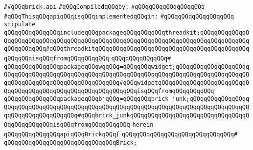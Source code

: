 \label{src/lib/x-kit/tut/badbricks-game/brick.api}
\verb|##qQQqbrick.api|\newline
\newline
\verb|#qQQqCompiledqQQqby:|\newline
\verb|#qQQqqQQqqQQqqQQqqQQq|\newline
\newline
\verb|#qQQqThisqQQqapiqQQqisqQQqimplementedqQQqin:|\newline
\verb|#qQQqqQQqqQQqqQQqqQQq|\newline
\newline
\verb|stipulate|\newline
\verb|qQQqqQQqqQQqqQQqincludeqQQqpackageqQQqqQQqqQQqthreadkit;qQQqqQQqqQQqqQQqqQQqqQQqqQQqqQQqqQQqqQQqqQQqqQQqqQQqqQQqqQQqqQQqqQQqqQQqqQQqqQQqqQQqqQQqqQQqqQQq#qQQqthreadkitqQQqqQQqqQQqqQQqqQQqqQQqqQQqqQQqqQQqqQQqqQQqqQQqqQQqisqQQqfromqQQqqQQqqQQq|\newline
\verb|qQQqqQQqqQQqqQQq#|\newline
\verb|qQQqqQQqqQQqqQQqpackageqQQqwgqQQq=qQQqqQQqwidget;qQQqqQQqqQQqqQQqqQQqqQQqqQQqqQQqqQQqqQQqqQQqqQQqqQQqqQQqqQQqqQQqqQQqqQQqqQQqqQQqqQQqqQQqqQQqqQQqqQQqqQQqqQQqqQQqqQQqqQQqqQQq#qQQqwidgetqQQqqQQqqQQqqQQqqQQqqQQqqQQqqQQqqQQqqQQqqQQqqQQqqQQqqQQqqQQqqQQqisqQQqfromqQQqqQQqqQQq|\newline
\verb|qQQqqQQqqQQqqQQqpackageqQQqbjqQQq=qQQqqQQqbrick_junk;qQQqqQQqqQQqqQQqqQQqqQQqqQQqqQQqqQQqqQQqqQQqqQQqqQQqqQQqqQQqqQQqqQQqqQQqqQQqqQQqqQQqqQQqqQQqqQQqqQQqqQQqqQQq#qQQqbrick_junkqQQqqQQqqQQqqQQqqQQqqQQqqQQqqQQqqQQqqQQqqQQqqQQqisqQQqfromqQQqqQQqqQQq|\newline
\verb|herein|\newline
\newline
\verb|qQQqqQQqqQQqqQQqapiqQQqBrickqQQq{|\newline
\verb|qQQqqQQqqQQqqQQqqQQqqQQqqQQqqQQq#|\newline
\verb|qQQqqQQqqQQqqQQqqQQqqQQqqQQqqQQqBrick;|\newline
